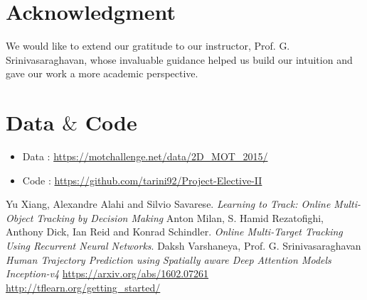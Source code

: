 \documentclass[journal]{IEEEtran}
\begin{document}
\section*{Acknowledgment}
We would like to extend our gratitude to our instructor, Prof. G. Srinivasaraghavan, whose invaluable guidance helped us build our intuition and gave our work a more academic perspective.


\ifCLASSOPTIONcaptionsoff
  \newpage
\fi

\section{Data $\&$ Code}
\begin{itemize}
    \item Data : \url{https://motchallenge.net/data/2D_MOT_2015/} 
    \item Code : \url{https://github.com/tarini92/Project-Elective-II}
\end{itemize}

\begin{thebibliography}{1}
Yu Xiang, Alexandre Alahi and Silvio Savarese.
\textit{Learning to Track: Online Multi-Object Tracking by Decision Making}
Anton Milan, S. Hamid Rezatofighi, Anthony Dick, Ian Reid and Konrad Schindler. 
\textit{Online Multi-Target Tracking Using Recurrent Neural Networks}.
Daksh Varshaneya, Prof. G. Srinivasaraghavan
\textit{Human Trajectory Prediction using Spatially aware Deep Attention Models}
\textit{Inception-v4}
\url{https://arxiv.org/abs/1602.07261}
\url{http://tflearn.org/getting_started/}

\end{thebibliography}
\end{document}
